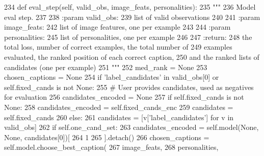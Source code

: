 \begin{DoxyCode}
234     \textcolor{keyword}{def }eval\_step(self, valid\_obs, image\_feats, personalities):
235         \textcolor{stringliteral}{"""}
236 \textcolor{stringliteral}{        Model eval step.}
237 \textcolor{stringliteral}{}
238 \textcolor{stringliteral}{        :param valid\_obs:}
239 \textcolor{stringliteral}{            list of valid observations}
240 \textcolor{stringliteral}{}
241 \textcolor{stringliteral}{        :param image\_feats:}
242 \textcolor{stringliteral}{            list of image features, one per example}
243 \textcolor{stringliteral}{}
244 \textcolor{stringliteral}{        :param personalities:}
245 \textcolor{stringliteral}{            list of personalities, one per example}
246 \textcolor{stringliteral}{}
247 \textcolor{stringliteral}{        :return:}
248 \textcolor{stringliteral}{            the total loss, number of correct examples, the total number of}
249 \textcolor{stringliteral}{            examples evaluated, the ranked position of each correct caption,}
250 \textcolor{stringliteral}{            and the ranked lists of candidates (one per example)}
251 \textcolor{stringliteral}{        """}
252         med\_rank = \textcolor{keywordtype}{None}
253         chosen\_captions = \textcolor{keywordtype}{None}
254         \textcolor{keywordflow}{if} \textcolor{stringliteral}{'label\_candidates'} \textcolor{keywordflow}{in} valid\_obs[0] \textcolor{keywordflow}{or} self.fixed\_cands \textcolor{keywordflow}{is} \textcolor{keywordflow}{not} \textcolor{keywordtype}{None}:
255             \textcolor{comment}{# User provides candidates, used as negatives for evaluation}
256             candidates\_encoded = \textcolor{keywordtype}{None}
257             \textcolor{keywordflow}{if} self.fixed\_cands \textcolor{keywordflow}{is} \textcolor{keywordflow}{not} \textcolor{keywordtype}{None}:
258                 candidates\_encoded = self.fixed\_cands\_enc
259                 candidates = self.fixed\_cands
260             \textcolor{keywordflow}{else}:
261                 candidates = [v[\textcolor{stringliteral}{'label\_candidates'}] \textcolor{keywordflow}{for} v \textcolor{keywordflow}{in} valid\_obs]
262                 \textcolor{keywordflow}{if} self.one\_cand\_set:
263                     candidates\_encoded = self.model(\textcolor{keywordtype}{None}, \textcolor{keywordtype}{None}, candidates[0])[
264                         1
265                     ].detach()
266             chosen\_captions = self.model.choose\_best\_caption(
267                 image\_feats,
268                 personalities,

\end{DoxyCode}
